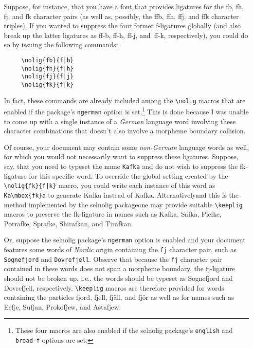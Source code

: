 \documentclass[12pt]{article}
\newcommand{\pkg}[1]{\textsf{#1}}
\newcommand{\opt}[1]{\texttt{#1}}
\newcommand{\cmmd}[1]{\texttt{\textbackslash #1}}
\begin{document}
Suppose, for instance, that you have a font that provides ligatures for the \mbox{fb}, \mbox{fh}, \mbox{fj}, and \mbox{fk} character pairs (as well as, possibly, the \mbox{ffb}, \mbox{ffh}, \mbox{ffj}, and \mbox{ffk} character triples). If you wanted to suppress the four former f-ligatures globally (and also break up the latter ligatures as ff-b, ff-h, ff-j, and~ff-k, respectively), you could do so by issuing the following commands: \egroup
\begin{Verbatim}
     \nolig{fb}{f|b}
     \nolig{fh}{f|h}
     \nolig{fj}{f|j}
     \nolig{fk}{f|k}
\end{Verbatim}
In fact, these commands are already included among the \cmmd{nolig} macros that are enabled if the package's \opt{ngerman} option is set.\footnote{These four macros are also enabled if the \pkg{selnolig} package's \opt{english} and \opt{broad-f} options are set.} This is done because I was unable to come up with a single instance of a \emph{German} language word involving these character combinations that doesn't also involve a morpheme boundary collision.


Of course, your document may contain some \emph{non-German} language words as well, for which you would not necessarily want to suppress these ligatures. Suppose, say, that you need to typeset the name \opt{Kafka} and do not wish to suppress the {\ebg \mbox{fk}}-ligature for this specific word. To override the global setting created by the \Verb+\nolig{fk}{f|k}+ macro, you could write each instance of this word as 
\Verb+Ka\mbox{fk}a+
to generate Ka\mbox{\ebg \mbox{fk}}a instead of Kafka. Alternatively\textemdash and this is the method implemented by the \pkg{selnolig} package\textemdash one may provide suitable \cmmd{keeplig} macros to preserve the {\ebg\mbox{fk}}-ligature in names such as {\ebg Kafka, Safka, Piefke, Potrafke, Sprafke, Shirafkan, and Tirafkan}. 



Or, suppose the \pkg{selnolig} package's \opt{ngerman} option is enabled and your document features some words of \emph{Nordic} origin containing the \opt{fj} character pair, such as \opt{Sognefjord} and \opt{Dovrefjell}. Observe that because the \opt{fj} character pair contained in these words does not span a morpheme boundary, the \mbox{fj}-ligature should not be broken up, i.e., the words should be typeset as Sognefjord and Dovrefjell, respectively.  \cmmd{keeplig} macros are therefore provided for words containing the particles fjord, fjell, fjäll, and fjör as well as for names such as Eefje, Sufjan, Prokofjew, and Astafjew.
\end{document}
